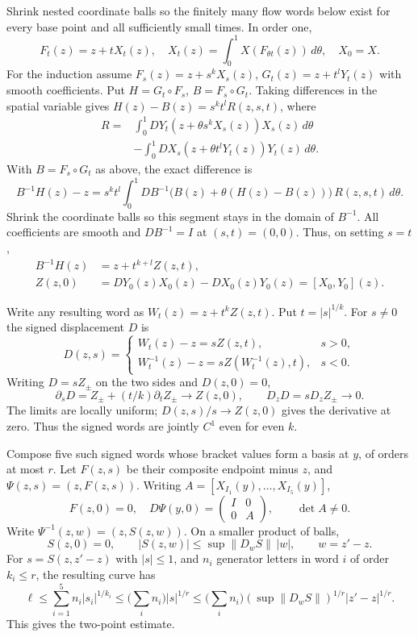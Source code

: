 Shrink nested coordinate balls so the finitely many flow words below exist
for every base point and all sufficiently small times. In order one,
\[
 F_t(z)=z+tX_t(z),\quad X_t(z)=\int_0^1 X(F_{\theta t}(z))\,d\theta,\quad X_0=X .
\]
For the induction assume $F_s(z)=z+s^kX_s(z)$, $G_t(z)=z+t^lY_t(z)$
with smooth coefficients. Put $H=G_t\circ F_s$, $B=F_s\circ G_t$.
Taking differences in the spatial variable gives $H(z)-B(z)=s^kt^l R(z,s,t)$, where
\[
\begin{aligned}
R={}&\int_0^1 D Y_t(z+\theta s^kX_s(z))X_s(z)\,d\theta\\
 &-\int_0^1 D X_s(z+\theta t^lY_t(z))Y_t(z)\,d\theta .
\end{aligned}
\]
With $B=F_s\circ G_t$ as above, the exact difference is
\[
 B^{-1}H(z)-z
 =s^kt^l\int_0^1 DB^{-1}\big(B(z)+\theta(H(z)-B(z))\big)\,R(z,s,t)\,d\theta .
\]
Shrink the coordinate balls so this segment stays in the domain of $B^{-1}$.
All coefficients are smooth and $DB^{-1}=I$ at $(s,t)=(0,0)$. Thus, on setting
$s=t$,
\[
 \begin{aligned}
 B^{-1}H(z)&=z+t^{k+l}Z(z,t),\\
 Z(z,0)&=DY_0(z)X_0(z)-DX_0(z)Y_0(z)=[X_0,Y_0](z).
 \end{aligned}
\]

Write any resulting word as $W_t(z)=z+t^k Z(z,t)$. Put $t=|s|^{1/k}$. For $s\ne0$ the signed displacement $D$ is
\[
 D(z,s)=
 \begin{cases}
 W_t(z)-z=s Z(z,t),&s>0,\\
 W_t^{-1}(z)-z=s Z(W_t^{-1}(z),t),&s<0 .
 \end{cases}
\]
Writing $D=sZ_\pm$ on the two sides and $D(z,0)=0$,
\[
 \partial_sD=Z_\pm+(t/k)\partial_tZ_\pm\to Z(z,0),\qquad
 D_zD=sD_zZ_\pm\to0 .
\]
The limits are locally uniform; $D(z,s)/s\to Z(z,0)$ gives the derivative
at zero. Thus the signed words are jointly $C^1$ even for even $k$.

Compose five such signed words whose bracket values form a basis at
$y$, of orders at most $r$. Let $F(z,s)$ be their composite endpoint minus $z$, and
$\Psi(z,s)=(z,F(z,s))$. Writing $A=[X_{I_1}(y),\ldots,X_{I_5}(y)]$,
\[
 F(z,0)=0,\quad D\Psi(y,0)=
 \begin{pmatrix}I&0\\0&A\end{pmatrix},\qquad \det A\ne0 .
\]
Write $\Psi^{-1}(z,w)=(z,S(z,w))$. On a smaller product of balls,
\[
 S(z,0)=0,\qquad
 |S(z,w)|\le\sup\|D_wS\|\,|w|,\qquad w=z'-z .
\]
For $s=S(z,z'-z)$ with $|s|\le1$, and $n_i$ generator letters in word
$i$ of order $k_i\le r$, the resulting curve has
\[
 \ell\le\sum_{i=1}^5 n_i |s_i|^{1/k_i}
 \le\Big(\sum_i n_i\Big)|s|^{1/r}
 \le\Big(\sum_i n_i\Big)(\sup\|D_w S\|)^{1/r}|z'-z|^{1/r}.
\]
This gives the two-point estimate.
